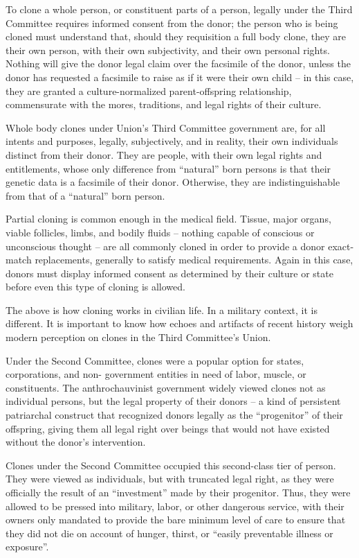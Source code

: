 To clone a whole person, or constituent parts of a person, legally under the Third Committee  
requires informed consent from the donor; the person who is being cloned must understand that,  
should they requisition a full body clone, they are their own person, with their own subjectivity,  
and their own personal rights. Nothing will give the donor legal claim over the facsimile of the  
donor, unless the donor has requested a facsimile to raise as if it were their own child -- in this  
case, they are granted a culture-normalized parent-offspring relationship, commensurate with the  
mores, traditions, and legal rights of their culture. 
 

Whole body clones under Union’s Third Committee government are, for all intents and purposes,  
legally, subjectively, and in reality, their own individuals distinct from their donor. They are people,  
with their own legal rights and entitlements, whose only difference from “natural” born persons is  
that their genetic data is a facsimile of their donor. Otherwise, they are indistinguishable from that  
of a “natural” born person. 
 

Partial cloning is common enough in the medical field. Tissue, major organs, viable follicles,  
limbs, and bodily fluids -- nothing capable of conscious or unconscious thought -- are all  
commonly cloned in order to provide a donor exact-match replacements, generally to satisfy  
medical requirements. Again in this case, donors must display informed consent as determined  
by their culture or state before even this type of cloning is allowed. 
 

The above is how cloning works in civilian life. In a military context, it is different. It is important  
to know how echoes and artifacts of recent history weigh modern perception on clones in the  
Third Committee’s Union. 
 

Under the Second Committee, clones were a popular option for states, corporations, and non- 
government entities in need of labor, muscle, or constituents. The anthrochauvinist government  
widely viewed clones not as individual persons, but the legal property of their donors -- a kind of  
persistent patriarchal construct that recognized donors legally as the “progenitor” of their  
offspring, giving them all legal right over beings that would not have existed without the donor’s  
intervention. 
 

Clones under the Second Committee occupied this second-class tier of person. They were  
viewed as individuals, but with truncated legal right, as they were officially the result of an  
“investment” made by their progenitor. Thus, they were allowed to be pressed into military, labor,  
or other dangerous service, with their owners only mandated to provide the bare minimum level  
of care to ensure that they did not die on account of hunger, thirst, or “easily preventable illness  
or exposure”. 
 

